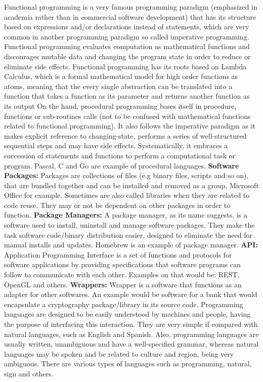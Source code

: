 \documentclass[conference]{IEEEtran}
\begin{document}
Functional programming is a very famous programming paradigm (emphasized in academia rather than in commercial software development) that has its structure based on expressions and/or declarations instead of statements, which are very common in another programming paradigm so called imperative programming. Functional programming evaluates  computation as mathematical functions and discourages mutable data and changing the program state in order to reduce or eliminate side effects. Functional programming has its roots based on Lambda Calculus, which is a formal mathematical model for high order functions as atoms, meaning that the every single abstraction can be translated into a function that takes a function as its parameter and returns another function as its output  
On the hand, procedural programming bases itself in procedure, functions or sub-routines calls (not to be confused with mathematical functions related to functional programming). It also follows the imperative paradigm as it makes explicit reference to changing-state, performs a series of well-structured sequential steps and may have side effects. Systematically, it embraces a succession of statements and functions to perform a computational task or program. Pascal, C and Go are example of procedural languages.
\textbf{Software Packages:} Packages are collections of files (e.g binary files, scripts and so on), that are bundled together and can be installed and removed as a group, Microsoft Office for example. Sometimes are also called libraries when they are related to code reuse. They may or not be dependent on other packages in order to function.
\textbf{Package Managers:} A package manager, as its name suggests, is a software used to install, uninstall and manage software packages. They make the task software code/binary distribution easier, designed to eliminate the need for manual installs and updates. Homebrew is an example of package manager.
\textbf{API:} Application Programming Interface is a set of functions and protocols for software applications by providing specifications that software programs can follow to communicate with each other. Examples on that would be: REST, OpenGL and others.
\textbf{Wrappers:} Wrapper is a software that functions as an adapter for other softwares. An example would be software for a bank that would encapsulate a cryptography package/library in its source code. 
Programming languages are designed to be easily understood by machines and people, having the purpose of interfacing this interaction. They are very simple if compared with natural languages, such as English and Spanish. Also, programming languages are usually written, unambiguous and have a well-specified grammar, whereas natural languages may be spoken and be related to culture and region, being very ambiguous. There are various types of languages such as programming, natural, sign and others. 
\end{document}
